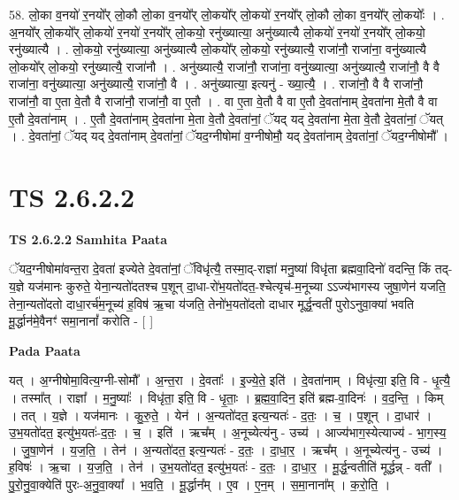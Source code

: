 \documentclass[17pt]{extarticle}
\begin{document}
58. लो॒का व॒नयो॑ र॒नयो᳚र् लो॒कौ लो॒का व॒नयो᳚र् लो॒कयो᳚र् लो॒कयो॑ र॒नयो᳚र् लो॒कौ लो॒का व॒नयो᳚र् लो॒कयोः᳚ । . अ॒नयो᳚र् लो॒कयो᳚र् लो॒कयो॑ र॒नयो॑ र॒नयो᳚र् लो॒कयो॒ रनु॑ख्यात्या॒ अनु॑ख्यात्यै लो॒कयो॑ र॒नयो॑ र॒नयो᳚र् लो॒कयो॒ रनु॑ख्यात्यै । . लो॒कयो॒ रनु॑ख्यात्या॒ अनु॑ख्यात्यै लो॒कयो᳚र् लो॒कयो॒ रनु॑ख्यात्यै॒ राजा॑नौ॒ राजा॑ना॒ वनु॑ख्यात्यै लो॒कयो᳚र् लो॒कयो॒ रनु॑ख्यात्यै॒ राजा॑नौ । . अनु॑ख्यात्यै॒ राजा॑नौ॒ राजा॑ना॒ वनु॑ख्यात्या॒ अनु॑ख्यात्यै॒ राजा॑नौ॒ वै वै राजा॑ना॒ वनु॑ख्यात्या॒ अनु॑ख्यात्यै॒ राजा॑नौ॒ वै । . अनु॑ख्यात्या॒ इत्यनु॑ - ख्या॒त्यै॒ । . राजा॑नौ॒ वै वै राजा॑नौ॒ राजा॑नौ॒ वा ए॒ता वे॒तौ वै राजा॑नौ॒ राजा॑नौ॒ वा ए॒तौ । . वा ए॒ता वे॒तौ वै वा ए॒तौ दे॒वता॑नाम् दे॒वता॑ना मे॒तौ वै वा ए॒तौ दे॒वता॑नाम् । . ए॒तौ दे॒वता॑नाम् दे॒वता॑ना मे॒ता वे॒तौ दे॒वता॑नां॒ ॅयद् यद् दे॒वता॑ना मे॒ता वे॒तौ दे॒वता॑नां॒ ॅयत् । . दे॒वता॑नां॒ ॅयद् यद् दे॒वता॑नाम् दे॒वता॑नां॒ ॅयद॒ग्नीषोमा॑ व॒ग्नीषोमौ॒ यद् दे॒वता॑नाम् दे॒वता॑नां॒ ॅयद॒ग्नीषोमौ᳚ । \newline
\pagebreak
{}
\section*{ TS 2.6.2.2 }

\textbf{TS 2.6.2.2 } \newline
\textbf{Samhita Paata} \newline

ॅयद॒ग्नीषोमा॑वन्त॒रा दे॒वता॑ इज्येते दे॒वता॑नां॒ ॅविधृ॑त्यै॒ तस्मा॒द्-राज्ञा॑ मनु॒ष्या॑ विधृ॑ता ब्रह्मवा॒दिनो॑ वदन्ति॒ किं तद्-य॒ज्ञे यज॑मानः कुरुते॒ येना॒न्यतो॑दतश्च प॒शून् दा॒धा-रो॑भ॒यतो॑दत॒-श्चेत्यृच॑-म॒नूच्या ऽऽज्य॑भागस्य जुषा॒णेन॑ यजति॒ तेना॒न्यतो॑दतो दाधा॒रर्च॑म॒नूच्य॑ ह॒विष॑ ऋ॒चा य॑जति॒ तेनो॑भ॒यतो॑दतो दाधार मूर्द्ध॒न्वती॑ पुरोऽनुवा॒क्या॑ भवति मू॒र्द्धान॑मे॒वैनꣳ॑ समा॒नानां᳚ करोति - [  ] \newline

\textbf{Pada Paata} \newline

यत् । अ॒ग्नीषोमा॒वित्य॒ग्नी-सोमौ᳚ । अ॒न्त॒रा । दे॒वताः᳚ । इ॒ज्ये॒ते॒ इति॑ । दे॒वता॑नाम् । विधृ॑त्या॒ इति॒ वि - धृ॒त्यै॒ । तस्मा᳚त् । राज्ञा᳚ । म॒नु॒ष्याः᳚ । विधृ॑ता॒ इति॒ वि - धृ॒ताः॒ । ब्र॒ह्म॒वा॒दिन॒ इति॑ ब्रह्म-वा॒दिनः॑ । व॒द॒न्ति॒ । किम् । तत् । य॒ज्ञे । यज॑मानः । कु॒रु॒ते॒ । येन॑ । अ॒न्यतो॑दत॒ इत्य॒न्यतः॑ - द॒तः॒ । च॒ । प॒शून् । दा॒धार॑ । उ॒भ॒यतो॑दत॒ इत्यु॑भ॒यतः॑-द॒तः॒ । च॒ । इति॑ । ऋच᳚म् । अ॒नूच्येत्य॑नु - उच्य॑ । आज्य॑भाग॒स्येत्याज्य॑ - भा॒ग॒स्य॒ । जु॒षा॒णेन॑ । य॒ज॒ति॒ । तेन॑ । अ॒न्यतो॑दत॒ इत्य॒न्यतः॑ - द॒तः॒ । दा॒धा॒र॒ । ऋच᳚म् । अ॒नूच्येत्य॑नु - उच्य॑ । ह॒विषः॑ । ऋ॒चा । य॒ज॒ति॒ । तेन॑ । उ॒भ॒यतो॑दत॒ इत्यु॑भ॒यतः॑ - द॒तः॒ । दा॒धा॒र॒ । मू॒र्द्ध॒न्वतीति॑ मूर्द्धन्न् - वती᳚ । पु॒रो॒नु॒वा॒क्येति॑ पुरः-अ॒नु॒वा॒क्या᳚ । भ॒व॒ति॒ । मू॒र्द्धान᳚म् । ए॒व । ए॒न॒म् । स॒मा॒नाना᳚म् । क॒रो॒ति॒ ।  \newline
\end{document}
